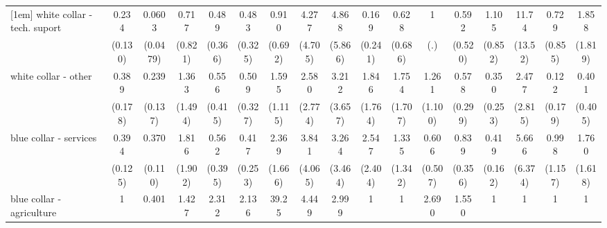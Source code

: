 {\begin{tabular}{l*{16}{c}}
[1em]
white collar - tech. suport&       0.234\sym{**} &      0.0603\sym{***}&       0.717         &       0.489         &       0.483         &       0.910         &       4.277         &       4.868         &       0.169         &       0.628         &           1         &       0.592         &       1.105         &       11.74\sym{*}  &       0.729         &       1.858         \\
                    &     (0.130)         &    (0.0479)         &     (0.821)         &     (0.366)         &     (0.325)         &     (0.692)         &     (4.705)         &     (5.866)         &     (0.241)         &     (0.686)         &         (.)         &     (0.520)         &     (0.852)         &     (13.52)         &     (0.855)         &     (1.819)         \\
[1em]
white collar - other&       0.389\sym{*}  &       0.239\sym{*}  &       1.363         &       0.556         &       0.509         &       1.595         &       2.580         &       3.212         &       1.846         &       1.754         &       1.261         &       0.578         &       0.350         &       2.477         &       0.122         &       0.401         \\
                    &     (0.178)         &     (0.137)         &     (1.494)         &     (0.415)         &     (0.327)         &     (1.115)         &     (2.774)         &     (3.657)         &     (1.764)         &     (1.707)         &     (1.100)         &     (0.299)         &     (0.253)         &     (2.815)         &     (0.179)         &     (0.405)         \\
[1em]
blue collar - services&       0.394\sym{**} &       0.370\sym{***}&       1.816         &       0.562         &       0.417         &       2.369         &       3.841         &       3.264         &       2.547         &       1.335         &       0.606         &       0.839         &       0.419\sym{*}  &       5.666         &       0.998         &       1.760         \\
                    &     (0.125)         &     (0.110)         &     (1.902)         &     (0.395)         &     (0.253)         &     (1.666)         &     (4.065)         &     (3.464)         &     (2.404)         &     (1.342)         &     (0.507)         &     (0.356)         &     (0.162)         &     (6.374)         &     (1.157)         &     (1.618)         \\
[1em]
blue collar - agriculture&           1         &       0.401         &       1.427         &       2.312         &       2.136         &       39.25\sym{*}  &       4.449         &       2.999         &           1         &           1         &       2.690         &       1.550         &           1         &           1         &           1         &           1         \\

\end{tabular}}

